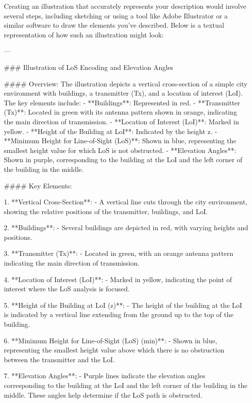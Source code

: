 Creating an illustration that accurately represents your description would involve several steps, including sketching or using a tool like Adobe Illustrator or a similar software to draw the elements you've described. Below is a textual representation of how such an illustration might look:

---

### Illustration of LoS Encoding and Elevation Angles

#### Overview:
The illustration depicts a vertical cross-section of a simple city environment with buildings, a transmitter (Tx), and a location of interest (LoI). The key elements include:
- **Buildings**: Represented in red.
- **Transmitter (Tx)**: Located in green with its antenna pattern shown in orange, indicating the main direction of transmission.
- **Location of Interest (LoI)**: Marked in yellow.
- **Height of the Building at LoI**: Indicated by the height z.
- **Minimum Height for Line-of-Sight (LoS)**: Shown in blue, representing the smallest height value for which LoS is not obstructed.
- **Elevation Angles**: Shown in purple, corresponding to the building at the LoI and the left corner of the building in the middle.

#### Key Elements:

1. **Vertical Cross-Section**:
   - A vertical line cuts through the city environment, showing the relative positions of the transmitter, buildings, and LoI.

2. **Buildings**:
   - Several buildings are depicted in red, with varying heights and positions.

3. **Transmitter (Tx)**:
   - Located in green, with an orange antenna pattern indicating the main direction of transmission.

4. **Location of Interest (LoI)**:
   - Marked in yellow, indicating the point of interest where the LoS analysis is focused.

5. **Height of the Building at LoI (z)**:
   - The height of the building at the LoI is indicated by a vertical line extending from the ground up to the top of the building.

6. **Minimum Height for Line-of-Sight (LoS) (min)**:
   - Shown in blue, representing the smallest height value above which there is no obstruction between the transmitter and the LoI.

7. **Elevation Angles**:
   - Purple lines indicate the elevation angles corresponding to the building at the LoI and the left corner of the building in the middle. These angles help determine if the LoS path is obstructed.

